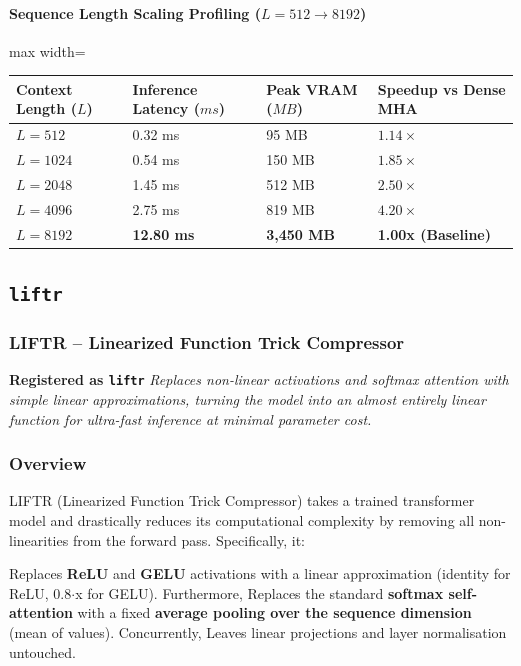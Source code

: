 \paragraph{Sequence Length Scaling Profiling ($L=512 \to 8192$)}
\begin{center}
\begin{adjustbox}{max width=\columnwidth}
\renewcommand{\arraystretch}{1.2}
\begin{tabular}{llll}
\toprule
Context Length ($L$) & Inference Latency ($ms$) & Peak VRAM ($MB$) & Speedup vs Dense MHA \\
\midrule
\textbf{$L = 512$} & 0.32 ms & 95 MB & $1.14\times$ \\
\textbf{$L = 1024$} & 0.54 ms & 150 MB & $1.85\times$ \\
\textbf{$L = 2048$} & 1.45 ms & 512 MB & $2.50\times$ \\
\textbf{$L = 4096$} & 2.75 ms & 819 MB & $4.20\times$ \\
\textbf{$L = 8192$} & \textbf{12.80 ms} & \textbf{3,450 MB} & \textbf{1.00x (Baseline)} \\


\bottomrule
\end{tabular}
\end{adjustbox}
\end{center}

\subsection{\texttt{liftr}}
\subsubsection*{LIFTR -- Linearized Function Trick Compressor}

\textbf{Registered as \texttt{liftr}}
\textit{Replaces non-linear activations and softmax attention with simple linear approximations, turning the model into an almost entirely linear function for ultra-fast inference at minimal parameter cost.}


\subsubsection*{Overview}

LIFTR (Linearized Function Trick Compressor) takes a trained transformer model and drastically reduces its computational complexity by removing all non-linearities from the forward pass. Specifically, it:

Replaces \textbf{ReLU} and \textbf{GELU} activations with a linear approximation (identity for ReLU, 0.8$\cdot$x for GELU). Furthermore, Replaces the standard \textbf{softmax self-attention} with a fixed \textbf{average pooling over the sequence dimension} (mean of values). Concurrently, Leaves linear projections and layer normalisation untouched.


